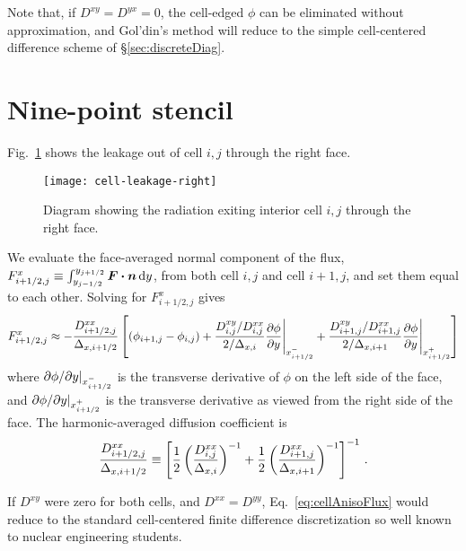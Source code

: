 Note that, if $D^{xy} = D^{yx}=0$, the cell-edged $\phi$ can be eliminated
without approximation, and
Gol'din's method will reduce to the simple cell-centered difference scheme of
\S\ref{sec:discreteDiag}.

\section{Nine-point stencil}

Fig.~\ref{fig:cellAnisoLeakage} shows the leakage out of cell $i,j$ through the
right face.
\begin{figure}[htb]
  \centering
  \texttt{[image: cell-leakage-right]}
  \caption{Diagram showing the radiation exiting interior cell $i,j$ through the
  right face.}
  \label{fig:cellAnisoLeakage}
\end{figure}
We evaluate the face-averaged normal component of the flux,
$F_{i+1/2,j}^x \equiv \int_{y_{j-1/2}}^{y_{j+1/2}} \bm{F} \bm{\cdot} \bm{n} \mathop{}\!\mathrm{d}
y$, from both cell $i,j$ and cell $i+1,j$, and set them equal to each other.
Solving for $F_{i+1/2,j}^x$ gives
\begin{equation} \label{eq:cellAnisoFlux}
  F_{i+1/2,j}^{x} \approx
  - \frac{D^{xx}_{i+1/2,j}}{\Delta_{x,i+1/2}}
  \left[ 
    \left( \phi_{i+1,j} - \phi_{i,j} \right)
  + \frac{D^{xy}_{i,j}/D^{xx}_{i,j}}{2/\Delta_{x,i}}
    \frac{\partial \phi}{\partial y} \Bigg|_{x_{i+1/2}^-}
  + \frac{D^{xy}_{i+1,j}/D^{xx}_{i+1,j}}{2/\Delta_{x,i+1}}
    \frac{\partial \phi}{\partial y} \Bigg|_{x_{i+1/2}^+}
  \right]
\end{equation}
where ${\partial \phi}/{\partial y} |_{x_{i+1/2}^-}$ is the transverse derivative of
$\phi$ on the left side of the face, and ${\partial \phi}/{\partial y} |_{x_{i+1/2}^+}$ is
the transverse derivative as viewed from the right side of the face.
The harmonic-averaged diffusion coefficient is
\begin{equation} \label{eq:cellEdgeDHarmonic}
  \frac{D^{xx}_{i+1/2,j}}{\Delta_{x,i+1/2}} \equiv \left[
  \frac12 \left( \frac{D^{xx}_{i,j}}{\Delta_{x,i}} \right)^{-1}
 + \frac12 \left( \frac{D^{xx}_{i+1,j}}{\Delta_{x,i+1}} \right)^{-1}
  \right]^{-1}\,.
\end{equation}

If $D^{xy}$ were zero for both cells, and $D^{xx}=D^{yy}$,
Eq.~\eqref{eq:cellAnisoFlux} would reduce to
the standard cell-centered finite difference discretization so well known to
nuclear engineering students.

